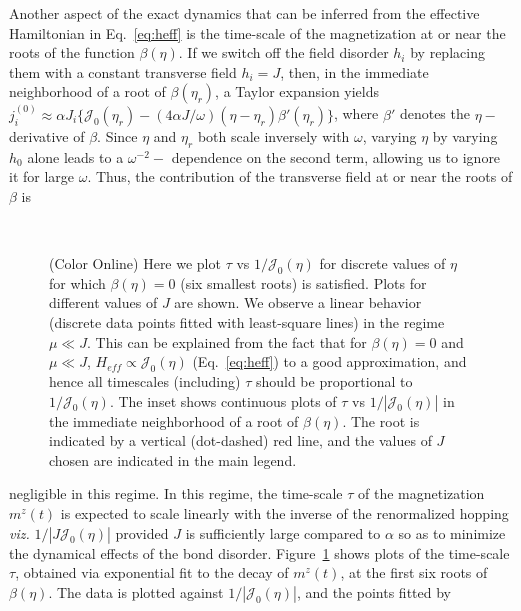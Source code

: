 \documentclass[aps,prl, notitlepage]{revtex4-1}
\begin{document}
Another aspect of the exact dynamics that can be inferred from the effective Hamiltonian in Eq.~\ref{eq:heff} is the time-scale of the magnetization at or near the roots of the function $\beta(\eta)$. If we switch off the field disorder $h_i$ by replacing them with a constant transverse field $h_i=J$, then, in the immediate neighborhood of a root of $\beta(\eta_r)$, a Taylor expansion yields $j^{(0)}_i \approx \alpha J_i\{ \mathcal{J}_0(\eta_r)-(4\alpha J/\omega) (\eta-\eta_r)\beta'(\eta_r)\}$, where $\beta'$ denotes the $\eta-$ derivative of $\beta$. Since $\eta$ and $\eta_r$ both scale inversely with $\omega$, varying $\eta$ by varying $h_0$ alone leads to a $\omega^{-2} - $ dependence on the second term, allowing us to ignore it for large $\omega$. Thus, the contribution of the transverse field at or near the roots of $\beta$ is 
\begin{figure}[!t]
\ 
\caption{(Color Online) 
Here we plot $\tau$ vs $1/{\mathcal J}_{0}(\eta)$ for discrete values of $\eta$
for which $\beta(\eta)=0$ (six smallest roots) is satisfied. Plots for different values of $J$ are shown.  
We observe a linear behavior (discrete data points fitted with least-square lines) in the regime $\mu \ll J.$
This can be explained from the fact that for $\beta(\eta) = 0$ and $\mu \ll J$, $H_{eff} \propto {\mathcal J}_{0}(\eta)$
(Eq.~\ref{eq:heff}) to a good approximation, and hence all timescales (including) $\tau$ should be proportional 
to $1/{\mathcal J}_{0}(\eta)$. The inset shows continuous plots of $\tau$ vs $1/|\mathcal{J}_0(\eta)|$ in the 
immediate neighborhood of a root of $\beta(\eta)$. The root is indicated by a vertical (dot-dashed) red line, 
and the values of $J$ chosen are indicated in the main legend.
} 
\label{fig:tfield}
\end{figure}
negligible in this regime. In this regime, the time-scale $\tau$ of the magnetization $m^z(t)$ is expected to scale linearly with the inverse of the renormalized hopping \textit{viz.} $1/|J\mathcal{J}_0(\eta)|$ provided $J$ is sufficiently large compared to $\alpha$ so as to minimize the dynamical effects of the bond disorder. Figure~\ref{fig:tfield} shows plots of the time-scale $\tau$, obtained via exponential fit to the decay of $m^z(t)$, at the first six roots of $\beta(\eta)$. The data is plotted against $1/|\mathcal{J}_0(\eta)|$, and the points fitted by 
\end{document}
